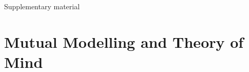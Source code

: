 \documentclass[compress]{beamer}
\begin{document}
\appendix
\begin{frame}{Supplementary material}
    \tableofcontents[hideallsubsections]
\end{frame}




\section[ToM]{Mutual Modelling and Theory of Mind}
\end{document}
